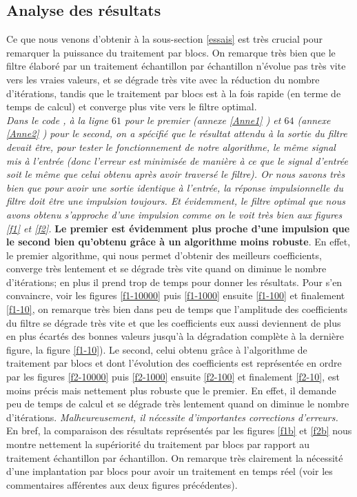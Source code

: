 \subsection{Analyse des résultats}
Ce que nous venons d'obtenir à la sous-section \ref{essais} est très crucial pour remarquer la puissance du traitement par blocs. On remarque très bien que le filtre élaboré par un traitement échantillon par échantillon n'évolue pas très vite vers les vraies valeurs, et se dégrade très vite avec la réduction du nombre d'itérations, tandis que le traitement par blocs est à la fois rapide (en terme de temps de calcul) et converge plus vite vers le filtre optimal.\\
\emph{Dans le code , à la ligne $ 61 $ pour le premier (annexe \ref{Anne1} ) et $ 64 $ (annexe \ref{Anne2} ) pour le second, on a spécifié que le résultat attendu à la sortie du filtre devait être, pour tester le fonctionnement de notre algorithme, le même signal mis à l'entrée (donc l'erreur est minimisée de manière à ce que le signal d'entrée soit le même que celui obtenu après avoir traversé le filtre). Or nous savons très bien que pour avoir une sortie identique à l'entrée, la réponse impulsionnelle du filtre doit être une impulsion toujours. Et évidemment, le filtre optimal que nous avons obtenu s'approche d'une impulsion comme on le voit très bien aux figures \ref{f1} et \ref{f2}.} \textbf{Le premier est évidemment plus proche d'une impulsion que le second bien qu'obtenu grâce à un algorithme moins robuste}. En effet, le premier algorithme, qui nous permet d'obtenir des meilleurs coefficients, converge très lentement et se dégrade très vite quand on diminue le nombre d'itérations; en plus il prend trop de temps pour donner les résultats. Pour s'en convaincre, voir les figures \ref{f1-10000} puis \ref{f1-1000} ensuite \ref{f1-100} et finalement \ref{f1-10}, on remarque très bien dans peu de temps que l'amplitude des coefficients du filtre se dégrade très vite et que les coefficients eux aussi deviennent de plus en plus écartés des bonnes valeurs jusqu'à la dégradation complète à la dernière figure, la figure \ref{f1-10}). Le second, celui obtenu grâce à l'algorithme de traitement par blocs et dont l'évolution des coefficients est représentée en ordre par les figures \ref{f2-10000} puis \ref{f2-1000} ensuite \ref{f2-100} et finalement \ref{f2-10}, est moins précis mais nettement plus robuste que le premier. En effet, il demande peu de temps de calcul et se dégrade très lentement quand on diminue le nombre d'itérations. \emph{Malheureusement, il nécessite d'importantes corrections d'erreurs.}\\
En bref, la comparaison des résultats représentés par les figures \ref{f1b} et \ref{f2b} nous montre nettement la supériorité du traitement par blocs par rapport au traitement échantillon par échantillon. On remarque très clairement la nécessité d'une implantation par blocs pour avoir un traitement en temps réel (voir les commentaires afférentes aux deux figures précédentes). 
